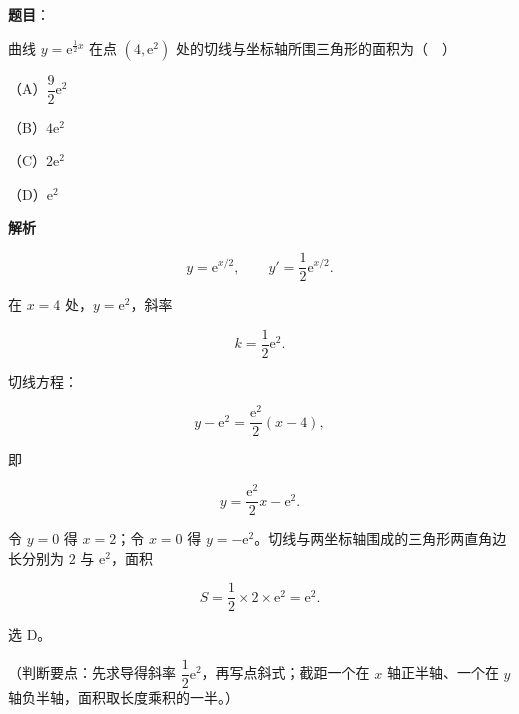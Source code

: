 \begin{answer}

\textbf{题目}：

曲线 $y=\mathrm e^{\frac12x}$ 在点 $(4,\mathrm e^2)$ 处的切线与坐标轴所围三角形的面积为（　）

（A）$\dfrac92\mathrm e^2$

（B）$4\mathrm e^2$

（C）$2\mathrm e^2$

（D）$\mathrm e^2$

\textbf{解析}

\nopagebreak[4]
\[y=\mathrm e^{x/2},\qquad y'=\frac12\mathrm e^{x/2}.\]

在 $x=4$ 处，$y=\mathrm e^2$，斜率

\nopagebreak[4]
\[k=\frac12\mathrm e^2.\]

切线方程：

\nopagebreak[4]
\[y-\mathrm e^2=\frac{\mathrm e^2}{2}(x-4),\]

即

\nopagebreak[4]
\[y=\frac{\mathrm e^2}{2}x-\mathrm e^2.\]

令 $y=0$ 得 $x=2$；令 $x=0$ 得 $y=-\mathrm e^2$。切线与两坐标轴围成的三角形两直角边长分别为 $2$ 与 $\mathrm e^2$，面积

\nopagebreak[4]
\[S=\frac12\times2\times\mathrm e^2=\mathrm e^2.\]

选 D。

（判断要点：先求导得斜率 $\dfrac12\mathrm e^2$，再写点斜式；截距一个在 $x$ 轴正半轴、一个在 $y$ 轴负半轴，面积取长度乘积的一半。）


\end{answer}
